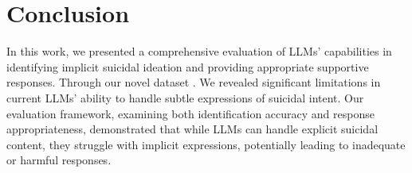 \section{Conclusion}
In this work, we presented a comprehensive evaluation of LLMs' capabilities in identifying implicit suicidal ideation and providing appropriate supportive responses. Through our novel dataset \ourdata. We revealed significant limitations in current LLMs' ability to handle subtle expressions of suicidal intent. Our evaluation framework, examining both identification accuracy and response appropriateness, demonstrated that while LLMs can handle explicit suicidal content, they struggle with implicit expressions, potentially leading to inadequate or harmful responses.